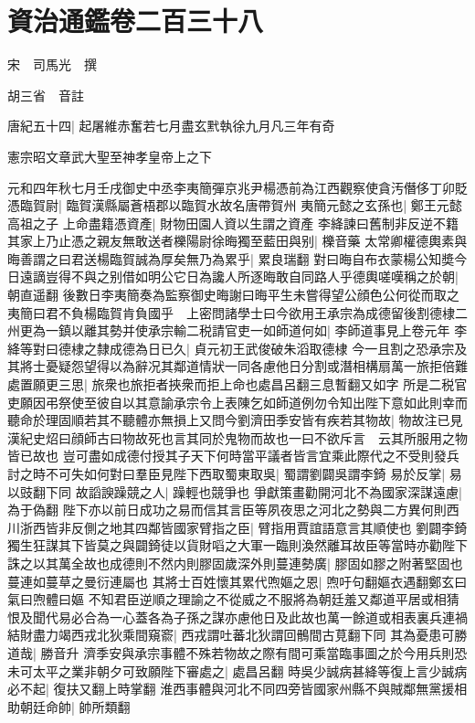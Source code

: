 \chapter{資治通鑑卷二百三十八}
宋　司馬光　撰

胡三省　音註

唐紀五十四|{
	起屠維赤奮若七月盡玄黓執徐九月凡三年有奇}


憲宗昭文章武大聖至神孝皇帝上之下

元和四年秋七月壬戌御史中丞李夷簡彈京兆尹楊憑前為江西觀察使貪汚僭侈丁卯貶憑臨賀尉|{
	臨賀漢縣屬蒼梧郡以臨賀水故名唐帶賀州}
夷簡元懿之玄孫也|{
	鄭王元懿高祖之子}
上命盡籍憑資產|{
	財物田園人資以生謂之資產}
李絳諫曰舊制非反逆不籍其家上乃止憑之親友無敢送者櫟陽尉徐晦獨至藍田與别|{
	櫟音藥}
太常卿權德輿素與晦善謂之曰君送楊臨賀誠為厚矣無乃為累乎|{
	累良瑞翻}
對曰晦自布衣蒙楊公知奬今日遠謫豈得不與之别借如明公它日為讒人所逐晦敢自同路人乎德輿嗟嘆稱之於朝|{
	朝直遥翻}
後數日李夷簡奏為監察御史晦謝曰晦平生未嘗得望公顔色公何從而取之夷簡曰君不負楊臨賀肯負國乎　上密問諸學士曰今欲用王承宗為成德留後割德棣二州更為一鎮以離其勢并使承宗輸二税請官吏一如師道何如|{
	李師道事見上卷元年}
李絳等對曰德棣之隸成德為日已久|{
	貞元初王武俊破朱滔取德棣}
今一且割之恐承宗及其將士憂疑怨望得以為辭况其鄰道情狀一同各慮他日分割或潛相構扇萬一旅拒倍難處置願更三思|{
	旅衆也旅拒者挾衆而拒上命也處昌呂翻三息暫翻又如字}
所是二税官吏願因弔祭使至彼自以其意諭承宗令上表陳乞如師道例勿令知出陛下意如此則幸而聽命於理固順若其不聽體亦無損上又問今劉濟田季安皆有疾若其物故|{
	物故注已見漢紀史炤曰顔師古曰物故死也言其同於鬼物而故也一曰不欲斥言　云其所服用之物皆已故也}
豈可盡如成德付授其子天下何時當平議者皆言宜乘此際代之不受則發兵討之時不可失如何對曰羣臣見陛下西取蜀東取吳|{
	蜀謂劉闢吳謂李錡}
易於反掌|{
	易以豉翻下同}
故謟諛躁競之人|{
	躁輕也競爭也}
爭獻策畫勸開河北不為國家深謀遠慮|{
	為于偽翻}
陛下亦以前日成功之易而信其言臣等夙夜思之河北之勢與二方異何則西川浙西皆非反側之地其四鄰皆國家臂指之臣|{
	臂指用賈誼語意言其順使也}
劉闢李錡獨生狂謀其下皆莫之與闢錡徒以貨財㗖之大軍一臨則渙然離耳故臣等當時亦勸陛下誅之以其萬全故也成德則不然内則膠固歲深外則蔓連勢廣|{
	膠固如膠之附著堅固也蔓連如蔓草之曼衍連屬也}
其將士百姓懷其累代喣嫗之恩|{
	喣吁句翻嫗衣遇翻鄭玄曰氣曰喣體曰嫗}
不知君臣逆順之理諭之不從威之不服將為朝廷羞又鄰道平居或相猜恨及聞代易必合為一心蓋各為子孫之謀亦慮他日及此故也萬一餘道或相表裏兵連禍結財盡力竭西戎北狄乘間窺窬|{
	西戎謂吐蕃北狄謂回鶻間古莧翻下同}
其為憂患可勝道哉|{
	勝音升}
濟季安與承宗事體不殊若物故之際有間可乘當臨事圖之於今用兵則恐未可太平之業非朝夕可致願陛下審處之|{
	處昌呂翻}
時吳少誠病甚絳等復上言少誠病必不起|{
	復扶又翻上時掌翻}
淮西事體與河北不同四旁皆國家州縣不與賊鄰無黨援相助朝廷命帥|{
	帥所類翻}
